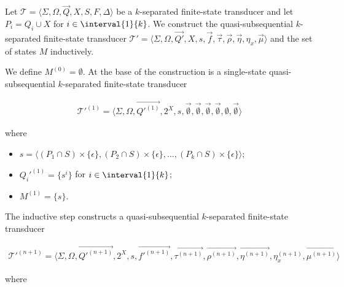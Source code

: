 \begin{construction}\label{conctruction_2}
	Let $\mathcal{T} = \langle \Sigma, \Omega, \vec{Q}, X, S, F, \Delta
	\rangle$ be a $k$-separated finite-state transducer and let $P_i = Q_i \cup
	X$ for $i \in \interval{1}{k}$. We construct the quasi-subsequential
	$k$-separated finite-state transducer $\mathcal{T}' = \langle \Sigma,
	\Omega, \vec{Q'}, X, s, \vec{f}, \vec{\tau}, \vec{\rho}, \vec{\eta},
	\eta_x, \vec{\mu} \rangle$ and the set of states $M$ inductively.

	\bigbreak
	We define $M^{(0)} = \emptyset$. At the base of the construction is a
	single-state quasi-subsequential $k$-separated finite-state transducer

	\begin{align*}
		\mathcal{T}'^{(1)} = \langle \Sigma, \Omega, \vec{Q'^{(1)}}, 2^X,
		s, \vec{\emptyset}, \vec{\emptyset}, \vec{\emptyset},
		\vec{\emptyset}, \emptyset, \vec{\emptyset} \rangle
	\end{align*}

	where

	\begin{itemize}
		\item $s = \langle (P_1 \cap S) \times \{ \epsilon \},
				(P_2 \cap S) \times \{ \epsilon \}, \ldots,
				(P_k \cap S) \times \{ \epsilon \} \rangle$;
		\item $Q_i'^{(1)} = \{ s^i \}$ for $i \in \interval{1}{k}$;
		\item $M^{(1)} = \{ s \}$.
	\end{itemize}

	The inductive step constructs a quasi-subsequential $k$-separated
	finite-state transducer

	\begin{align*}
		\mathcal{T}'^{(n+1)} = \langle \Sigma, \Omega, \vec{Q'^{(n+1)}},
		2^X, s, \vec{f'^{(n+1)}}, \vec{\tau^{(n+1)}}, \vec{\rho^{(n+1)}},
		\vec{\eta^{(n+1)}}, \eta_x^{(n+1)}, \vec{\mu^{(n+1)}} \rangle
	\end{align*}

	where


\end{construction}
